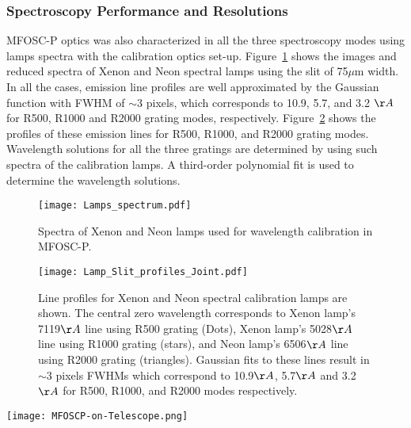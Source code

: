 \par 	
\subsubsection{Spectroscopy Performance and Resolutions}
\label{subsubsec-LabSpec}
\par

MFOSC-P optics was also characterized in all the three spectroscopy modes using lamps spectra with the calibration optics set-up. Figure~\ref{fig-LampSpec} shows the images and reduced spectra of Xenon and Neon spectral lamps using the slit of 75$\mu$m width.  In all the cases, emission line profiles are well approximated by the Gaussian function with FWHM of $\sim$3 pixels, which corresponds to 10.9, 5.7, and 3.2 $\AA$ for R500, R1000 and R2000 grating modes, respectively. Figure~\ref{fig-LineProfile-Joint} shows the profiles of these emission lines for R500, R1000, and R2000 grating modes. Wavelength solutions for all the three gratings are determined by using such spectra of the calibration lamps. A third-order polynomial fit is used to determine the wavelength solutions.




\begin{figure}
	\centering
	\texttt{[image: Lamps\_spectrum.pdf]}
	\vspace{0.2cm}
	\caption{Spectra of Xenon and Neon lamps used for wavelength calibration in MFOSC-P.}
	\label{fig-LampSpec}
\end{figure}


\begin{figure}
	\centering
	\texttt{[image: Lamp\_Slit\_profiles\_Joint.pdf]}
	\vspace{0.2cm}
	\caption{Line profiles for Xenon and Neon spectral calibration lamps are shown. The central zero wavelength corresponds to 	Xenon lamp's 7119$\AA$ line using R500 grating (Dots), Xenon lamp's 5028$\AA$ line using R1000 grating (stars), and Neon lamp's 6506$\AA$ line using R2000 grating (triangles). Gaussian fits to these lines result in $\sim$3 pixels FWHMs which correspond to 10.9$\AA$, 5.7$\AA$ and 3.2$\AA$ for R500, R1000, and R2000 modes respectively.}
	\label{fig-LineProfile-Joint}
\end{figure}


\begin{figure*}
	\centering
	\texttt{[image: MFOSCP-on-Telescope.png]}
	\vspace{0.2cm}
	\caption{MFOSC-P instrument mounted on the PRL 1.2m Telescope.}
	\label{fig-OnTel}
\end{figure*}



